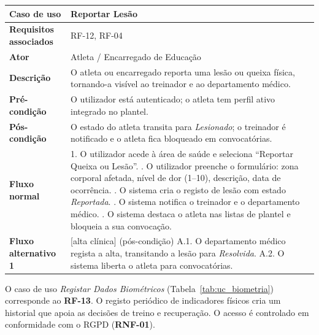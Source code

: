 {\begin{xltabular}{\textwidth}{|l|X|}
\textbf{Caso de uso} & Reportar Lesão \\ \hline
\textbf{Requisitos associados} & RF-12, RF-04 \\ \hline
\textbf{Ator} & Atleta / Encarregado de Educação \\ \hline
\textbf{Descrição} & O atleta ou encarregado reporta uma lesão ou queixa física, tornando-a visível ao treinador e ao departamento médico. \\ \hline
\textbf{Pré-condição} & O utilizador está autenticado; o atleta tem perfil ativo integrado no plantel. \\ \hline
\textbf{Pós-condição} & O estado do atleta transita para \textit{Lesionado}; o treinador é notificado e o atleta fica bloqueado em convocatórias. \\ \hline
\textbf{Fluxo normal} &
1. O utilizador acede à área de saúde e seleciona ``Reportar Queixa ou Lesão''. . O utilizador preenche o formulário: zona corporal afetada, nível de dor (1--10), descrição, data de ocorrência. . O sistema cria o registo de lesão com estado \textit{Reportada}. . O sistema notifica o treinador e o departamento médico. . O sistema destaca o atleta nas listas de plantel e bloqueia a sua convocação. \\ \hline
\textbf{Fluxo alternativo 1} &
[alta clínica] (pós-condição) \newline
A.1. O departamento médico regista a alta, transitando a lesão para \textit{Resolvida}. \newline
A.2. O sistema liberta o atleta para convocatórias. \\ \hline
\end{xltabular}
}

O caso de uso \textit{Registar Dados Biométricos} (Tabela~\ref{tab:uc_biometria}) corresponde ao \textbf{RF-13}. O registo periódico de indicadores físicos cria um historial que apoia as decisões de treino e recuperação. O acesso é controlado em conformidade com o RGPD (\textbf{RNF-01}).

